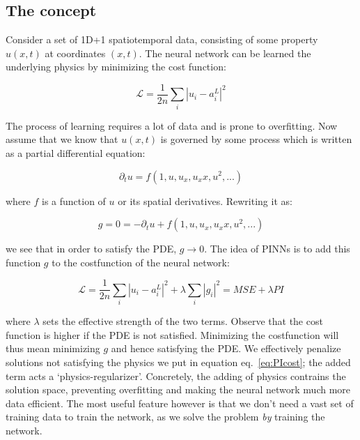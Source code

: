 \documentclass[12pt,a4paper,]{harvard-thesis}
\begin{document}
\hypertarget{the-concept}{%
\subsection{The concept}\label{the-concept}}

Consider a set of 1D+1 spatiotemporal data, consisting of some property
\(u(x,t)\) at coordinates \((x,t)\). The neural network can be learned
the underlying physics by minimizing the cost function:

\[
\mathcal{L} = \frac{1}{2n}\sum_i|u_i-a^L_i|^2
\]

The process of learning requires a lot of data and is prone to
overfitting. Now assume that we know that \(u(x,t)\) is governed by some
process which is written as a partial differential equation:

\[
\partial_t u = f(1, u, u_x, u_xx, u^2, ...)
\]

where \(f\) is a function of \(u\) or its spatial derivatives. Rewriting
it as:

\begin{equation}
g = 0 = -\partial_t u + f(1, u, u_x, u_xx, u^2, ...)
\label{eq:PIcost}\end{equation}

we see that in order to satisfy the PDE, \(g\to0\). The idea of PINNs is
to add this function \(g\) to the costfunction of the neural network:

\[
\mathcal{L} = \frac{1}{2n}\sum_i|u_i-a^L_i|^2 + \lambda\sum_i|g_i|^2 = MSE + \lambda PI
\]

where \(\lambda\) sets the effective strength of the two terms. Observe
that the cost function is higher if the PDE is not satisfied. Minimizing
the costfunction will thus mean minimizing \(g\) and hence satisfying
the PDE. We effectively penalize solutions not satisfying the physics we
put in equation eq.~\ref{eq:PIcost}; the added term acts a
`physics-regularizer'. Concretely, the adding of physics contrains the
solution space, preventing overfitting and making the neural network
much more data efficient. The most useful feature however is that we
don't need a vast set of training data to train the network, as we solve
the problem \emph{by} training the network.
\end{document}
